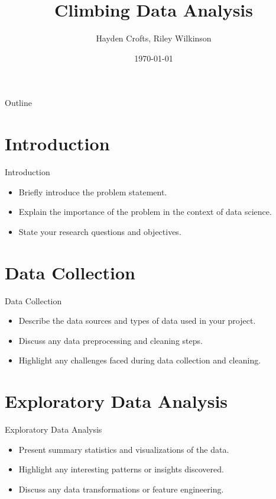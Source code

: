 \documentclass{beamer}
\title[Your Project Title]{Climbing Data Analysis}
\author[Your Name]{Hayden Crofts, Riley Wilkinson}
\institute[Your University]{Stat 386}
\date{\today}
\begin{document}
\begin{frame}
\titlepage
\end{frame}

\begin{frame}{Outline}
\tableofcontents
\end{frame}

\section{Introduction}

\begin{frame}{Introduction}
\begin{itemize}
  \item Briefly introduce the problem statement.
  \item Explain the importance of the problem in the context of data science.
  \item State your research questions and objectives.
\end{itemize}
\end{frame}

\section{Data Collection}

\begin{frame}{Data Collection}
\begin{itemize}
  \item Describe the data sources and types of data used in your project.
  \item Discuss any data preprocessing and cleaning steps.
  \item Highlight any challenges faced during data collection and cleaning.
\end{itemize}
\end{frame}

\section{Exploratory Data Analysis}

\begin{frame}{Exploratory Data Analysis}
\begin{itemize}
  \item Present summary statistics and visualizations of the data.
  \item Highlight any interesting patterns or insights discovered.
  \item Discuss any data transformations or feature engineering.
\end{itemize}
\end{frame}
\end{document}
